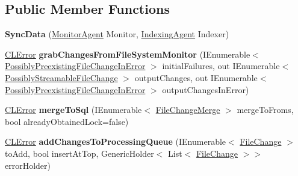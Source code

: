 \subsection*{Public Member Functions}
\begin{DoxyCompactItemize}
\item 
\hypertarget{class_cloud_api_public_1_1_file_monitor_1_1_sync_implementation_1_1_sync_data_af0b43d9edc92deb302643771046efbcd}{{\bfseries Sync\-Data} (\hyperlink{class_cloud_api_public_1_1_file_monitor_1_1_monitor_agent}{Monitor\-Agent} Monitor, \hyperlink{class_cloud_api_public_1_1_s_q_l_indexer_1_1_indexing_agent}{Indexing\-Agent} Indexer)}\label{class_cloud_api_public_1_1_file_monitor_1_1_sync_implementation_1_1_sync_data_af0b43d9edc92deb302643771046efbcd}

\item 
\hypertarget{class_cloud_api_public_1_1_file_monitor_1_1_sync_implementation_1_1_sync_data_a0def21aaaf2d09e5697011105632437f}{\hyperlink{class_cloud_api_public_1_1_model_1_1_c_l_error}{C\-L\-Error} {\bfseries grab\-Changes\-From\-File\-System\-Monitor} (I\-Enumerable$<$ \hyperlink{struct_cloud_api_public_1_1_model_1_1_possibly_preexisting_file_change_in_error}{Possibly\-Preexisting\-File\-Change\-In\-Error} $>$ initial\-Failures, out I\-Enumerable$<$ \hyperlink{struct_cloud_api_public_1_1_model_1_1_possibly_streamable_file_change}{Possibly\-Streamable\-File\-Change} $>$ output\-Changes, out I\-Enumerable$<$ \hyperlink{struct_cloud_api_public_1_1_model_1_1_possibly_preexisting_file_change_in_error}{Possibly\-Preexisting\-File\-Change\-In\-Error} $>$ output\-Changes\-In\-Error)}\label{class_cloud_api_public_1_1_file_monitor_1_1_sync_implementation_1_1_sync_data_a0def21aaaf2d09e5697011105632437f}

\item 
\hypertarget{class_cloud_api_public_1_1_file_monitor_1_1_sync_implementation_1_1_sync_data_a6521a7c3fa76af5fd3566c8f0f066390}{\hyperlink{class_cloud_api_public_1_1_model_1_1_c_l_error}{C\-L\-Error} {\bfseries merge\-To\-Sql} (I\-Enumerable$<$ \hyperlink{struct_cloud_api_public_1_1_model_1_1_file_change_merge}{File\-Change\-Merge} $>$ merge\-To\-Froms, bool already\-Obtained\-Lock=false)}\label{class_cloud_api_public_1_1_file_monitor_1_1_sync_implementation_1_1_sync_data_a6521a7c3fa76af5fd3566c8f0f066390}

\item 
\hypertarget{class_cloud_api_public_1_1_file_monitor_1_1_sync_implementation_1_1_sync_data_adb4a731e081e547e94d2c911ee61a245}{\hyperlink{class_cloud_api_public_1_1_model_1_1_c_l_error}{C\-L\-Error} {\bfseries add\-Changes\-To\-Processing\-Queue} (I\-Enumerable$<$ \hyperlink{class_cloud_api_public_1_1_model_1_1_file_change}{File\-Change} $>$ to\-Add, bool insert\-At\-Top, Generic\-Holder$<$ List$<$ \hyperlink{class_cloud_api_public_1_1_model_1_1_file_change}{File\-Change} $>$$>$ error\-Holder)}\label{class_cloud_api_public_1_1_file_monitor_1_1_sync_implementation_1_1_sync_data_adb4a731e081e547e94d2c911ee61a245}


\end{DoxyCompactItemize}
